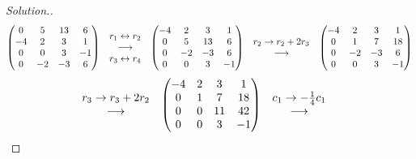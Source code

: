 \documentclass[11pt,a4paper]{article}
\theoremstyle{definition}
\newenvironment{solution}
  {\renewcommand{\qedsymbol}{}\begin{proof}[\textit{Solution}.]}
  {\end{proof}}
\begin{document}
\begin{solution}
$$
\begin{pmatrix}
0&5&13&6\\-4&2&3&1\\0&0&3&-1\\0&-2&-3&6\\
\end{pmatrix}
\hspace{0.3cm}
\begin{matrix}
r_1\leftrightarrow r_2\\ \longrightarrow\\ r_3\leftrightarrow r_4\\
\end{matrix}
\hspace{0.3cm}
\begin{pmatrix}
-4&2&3&1\\0&5&13&6\\0&-2&-3&6\\0&0&3&-1\\
\end{pmatrix}
\hspace{0.3cm}
\begin{matrix}
r_2\rightarrow r_2+2r_3\\ \longrightarrow\\
\end{matrix}
\hspace{0.3cm}
\begin{pmatrix}
-4&2&3&1\\0&1&7&18\\0&-2&-3&6\\0&0&3&-1\\
\end{pmatrix}
$$
\begin{align*}
&
\begin{matrix}
r_3\rightarrow r_3+2r_2\\ \longrightarrow\\
\end{matrix}
\hspace{0.3cm}
\begin{pmatrix}
-4&2&3&1\\0&1&7&18\\0&0&11&42\\0&0&3&-1\\
\end{pmatrix}
\hspace{0.3cm}
\begin{matrix}
c_1\rightarrow -\frac{1}{4}c_1\\ \longrightarrow\\

\end{matrix}
\end{align*}
\end{solution}
\end{document}
